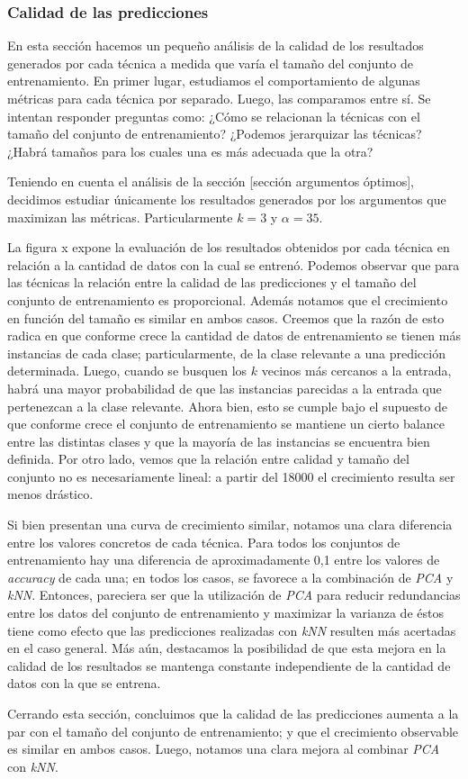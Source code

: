 \subsubsection{Calidad de las predicciones}
En esta sección hacemos un pequeño análisis de la calidad de los resultados generados por cada técnica a medida que varía el tamaño del conjunto de entrenamiento. En primer lugar, estudiamos el comportamiento de algunas métricas para cada técnica por separado. Luego, las comparamos entre sí. Se intentan responder preguntas como: ¿Cómo se relacionan la técnicas con el tamaño del conjunto de entrenamiento? ¿Podemos jerarquizar las técnicas? ¿Habrá tamaños para los cuales una es más adecuada que la otra?
\par
Teniendo en cuenta el análisis de la sección [sección argumentos óptimos], decidimos estudiar únicamente los resultados generados por los argumentos que maximizan las métricas. Particularmente $k=3$ y $\alpha=35$.
\par
[grafico comparacion métricas]
\par 
La figura x expone la evaluación de los resultados obtenidos por cada técnica en relación a la cantidad de datos con la cual se entrenó. Podemos observar que para las técnicas la relación entre la calidad de las predicciones y el tamaño del conjunto de entrenamiento es proporcional. Además notamos que el crecimiento en función del tamaño es similar en ambos casos. Creemos que la razón de esto radica en que conforme crece la cantidad de datos de entrenamiento se tienen más instancias de cada clase; particularmente, de la clase relevante a una predicción determinada. Luego, cuando se busquen los $k$ vecinos más cercanos a la entrada, habrá una mayor probabilidad de que las instancias parecidas a la entrada que pertenezcan a la clase relevante. Ahora bien, esto se cumple bajo el supuesto de que conforme crece el conjunto de entrenamiento se mantiene un cierto balance entre las distintas clases y que la mayoría de las instancias se encuentra bien definida. Por otro lado, vemos que la relación entre calidad y tamaño del conjunto no es necesariamente lineal: a partir del 18000 el crecimiento resulta ser menos drástico.
\par
Si bien presentan una curva de crecimiento similar, notamos una clara diferencia entre los valores concretos de cada técnica. Para todos los conjuntos de entrenamiento hay una diferencia de aproximadamente 0,1 entre los valores de \emph{accuracy} de cada una; en todos los casos, se favorece a la combinación de \emph{PCA} y \emph{kNN}. Entonces, pareciera ser que la utilización de \emph{PCA} para reducir redundancias entre los datos del conjunto de entrenamiento y maximizar la varianza de éstos tiene como efecto que las predicciones realizadas con \emph{kNN} resulten más acertadas en el caso general. Más aún, destacamos la posibilidad de que esta mejora en la calidad de los resultados se mantenga constante independiente de la cantidad de datos con la que se entrena.
\par
Cerrando esta sección, concluimos que la calidad de las predicciones aumenta a la par con el tamaño del conjunto de entrenamiento; y que el crecimiento observable es similar en ambos casos. Luego, notamos una clara mejora al combinar \emph{PCA} con \emph{kNN}.
